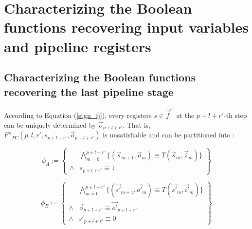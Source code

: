 \documentclass[conference]{IEEEtran}
\begin{document}
% 
% 


\section{Characterizing the Boolean functions recovering input variables and pipeline registers}\label{sec_char}
\subsection{Characterizing the Boolean functions recovering the last pipeline stage}

According to Equation (\ref{stgn_fj}),
every registers $s\in \vec{f}^{r'}$ at the $p+l+r'$-th step can be uniquely determined by $\vec{o}_{p+l+r'}$.
That is,
$F''_{PC}(p,l,r',s_{p+l+r'},\vec{o}_{p+l+r'})$ is unsatisfiable and can be partitioned into :

\begin{equation}
 \phi_A := 
 \left\{
\begin{array}{cc}
&\bigwedge_{m=0}^{p+l+r'}
\{
(\vec{s}_{m+1},\vec{o}_m)\equiv T(\vec{s}_m,\vec{i}_m)
\}
\\
\wedge& s_{p+l+r'}\equiv 1 
\end{array}
\right\}
\end{equation}

\begin{equation}
\phi_B := 
\left\{
\begin{array}{cc}
&\bigwedge_{m=0}^{p+l+r'}
\{
(\vec{s'}_{m+1},\vec{o'}_m)\equiv T(\vec{s'}_m,\vec{i'}_m)
\}
\\
\wedge&\vec{o}_{p+l+r'}\equiv \vec{o'}_{p+l+r'} \\
\wedge& s'_{p+l+r'}\equiv 0 
\end{array}
\right\}
\end{equation}
\end{document}
